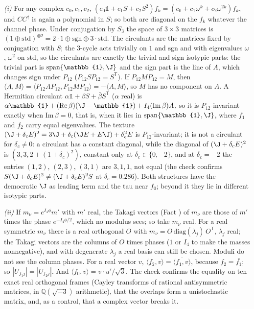 \emph{(i)} For any complex $c_{0}, c_{1}, c_{2}$, $(c_{0}\mathbb{1} + c_{1}S + c_{2}S^{2})f_{k} = (c_{0} + c_{1}\omega^{k} + c_{2}\omega^{2k})f_{k}$, and $CC^{\dagger}$ is again a polynomial in $S$; so both are diagonal on the $f_{k}$ whatever the channel phase. Under conjugation by $S_{3}$ the space of $3 \times 3$ matrices is $(1 \oplus \mathrm{std})^{\otimes 2} = 2 \cdot 1 \oplus \mathrm{sgn} \oplus 3 \cdot \mathrm{std}$. The circulants are the matrices fixed by conjugation with $S$; the $3$-cycle acts trivially on $1$ and $\mathrm{sgn}$ and with eigenvalues $\omega$, $\omega^{2}$ on $\mathrm{std}$, so the circulants are exactly the trivial and sign isotypic parts: the trivial part is $\mathrm{span}\{\mathbb{1}, \J\}$ and the sign part is the line of $A$, which changes sign under $P_{12}$ ($P_{12}SP_{12} = S^{\mathsf{T}}$). If $P_{12}MP_{12} = M$, then $\langle A, M\rangle = \langle P_{12}AP_{12}, P_{12}MP_{12}\rangle = -\langle A, M\rangle$, so $M$ has no component on $A$. A Hermitian circulant $\alpha\mathbb{1} + \beta S + \bar\beta S^{\mathsf{T}}$ ($\alpha$ real) is $\alpha\mathbb{1} + (\mathrm{Re}\,\beta)(\J - \mathbb{1}) + I_{4}(\mathrm{Im}\,\beta)A$, so it is $P_{12}$-invariant exactly when $\mathrm{Im}\,\beta = 0$, that is, when it lies in $\mathrm{span}\{\mathbb{1}, \J\}$, where $f_{1}$ and $f_{2}$ carry equal eigenvalues. The texture $(\J + \delta_{c}E)^{2} = 3\J + \delta_{c}(\J E + E\J) + \delta_{c}^{2}E$ is $P_{12}$-invariant; it is not a circulant for $\delta_{c} \ne 0$: a circulant has a constant diagonal, while the diagonal of $(\J + \delta_{c}E)^{2}$ is $(3, 3, 2 + (1 + \delta_{c})^{2})$, constant only at $\delta_{c} \in \{0, -2\}$, and at $\delta_{c} = -2$ the entries $(1,2)$, $(2,3)$, $(3,1)$ are $3, 1, 1$, not equal (the check confirms $S(\J + \delta_{c}E)^{2} \ne (\J + \delta_{c}E)^{2}S$ at $\delta_{c} = 0.286$). Both structures have the democratic $\J$ as leading term and the tau near $f_{0}$; beyond it they lie in different isotypic parts.

\emph{(ii)} If $m_{\nu} = e^{I_{4}\phi}m'$ with $m'$ real, the Takagi vectors (Fact ) of $m_{\nu}$ are those of $m'$ times the phase $e^{-I_{4}\phi/2}$, which no modulus sees; so take $m_{\nu}$ real. For a real symmetric $m_{\nu}$ there is a real orthogonal $O$ with $m_{\nu} = O\,\mathrm{diag}(\lambda_{j})\,O^{\mathsf{T}}$, $\lambda_{j}$ real; the Takagi vectors are the columns of $O$ times phases ($1$ or $I_{4}$ to make the masses nonnegative), and with degenerate $\lambda_{j}$ a real basis can still be chosen. Moduli do not see the column phases. For a real vector $v$, $\langle f_{2}, v\rangle = \overline{\langle f_{1}, v\rangle}$, because $f_{2} = \bar{f_{1}}$; so $|U_{f_{1}j}| = |U_{f_{2}j}|$. And $\langle f_{0}, v\rangle = v\cdot u'/\sqrt3$. The check confirms the equality on ten exact real orthogonal frames (Cayley transforms of rational antisymmetric matrices, in $\mathbb{Q}(\sqrt{-3})$ arithmetic), that the overlaps form a unistochastic matrix, and, as a control, that a complex vector breaks it.

